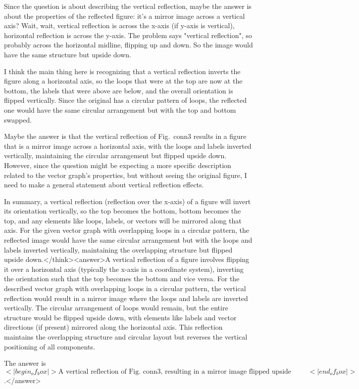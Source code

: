 Since the question is about describing the vertical reflection, maybe the answer is about the properties of the reflected figure: it's a mirror image across a vertical axis? Wait, wait, vertical reflection is across the x-axis (if y-axis is vertical), horizontal reflection is across the y-axis. The problem says "vertical reflection", so probably across the horizontal midline, flipping up and down. So the image would have the same structure but upside down. 

I think the main thing here is recognizing that a vertical reflection inverts the figure along a horizontal axis, so the loops that were at the top are now at the bottom, the labels that were above are below, and the overall orientation is flipped vertically. Since the original has a circular pattern of loops, the reflected one would have the same circular arrangement but with the top and bottom swapped. 

Maybe the answer is that the vertical reflection of Fig.~conn3 results in a figure that is a mirror image across a horizontal axis, with the loops and labels inverted vertically, maintaining the circular arrangement but flipped upside down. However, since the question might be expecting a more specific description related to the vector graph's properties, but without seeing the original figure, I need to make a general statement about vertical reflection effects. 

In summary, a vertical reflection (reflection over the x-axis) of a figure will invert its orientation vertically, so the top becomes the bottom, bottom becomes the top, and any elements like loops, labels, or vectors will be mirrored along that axis. For the given vector graph with overlapping loops in a circular pattern, the reflected image would have the same circular arrangement but with the loops and labels inverted vertically, maintaining the overlapping structure but flipped upside down.</think><answer>A vertical reflection of a figure involves flipping it over a horizontal axis (typically the x-axis in a coordinate system), inverting the orientation such that the top becomes the bottom and vice versa. For the described vector graph with overlapping loops in a circular pattern, the vertical reflection would result in a mirror image where the loops and labels are inverted vertically. The circular arrangement of loops would remain, but the entire structure would be flipped upside down, with elements like labels and vector directions (if present) mirrored along the horizontal axis. This reflection maintains the overlapping structure and circular layout but reverses the vertical positioning of all components.  

The answer is \(<|begin_of_box|>\text{A vertical reflection of Fig.~conn3, resulting in a mirror image flipped upside down with loops and labels inverted vertically}<|end_of_box|>\).</answer>